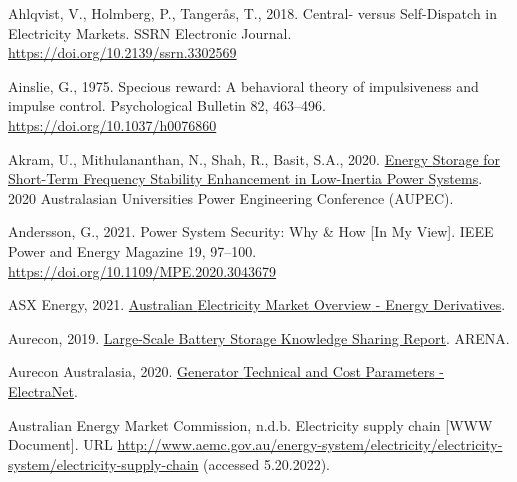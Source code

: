 \documentclass[12pt,a4paper,]{report}
\newlength{\cslhangindent}
\newenvironment{CSLReferences}[2] %
 {%
  \setlength{\parindent}{0pt}
  \ifodd #1 \everypar{\setlength{\hangindent}{\cslhangindent}}\ignorespaces\fi
  \ifnum #2 > 0
  \setlength{\parskip}{#2\baselineskip}
  \fi
 }%
 {}
\begin{document}
\begin{CSLReferences}{1}{0}
\leavevmode{}%
Ahlqvist, V., Holmberg, P., Tangerås, T., 2018. Central- versus
{Self-Dispatch} in {Electricity Markets}. SSRN Electronic Journal.
\url{https://doi.org/10.2139/ssrn.3302569}

\leavevmode{}%
Ainslie, G., 1975. Specious reward: {A} behavioral theory of
impulsiveness and impulse control. Psychological Bulletin 82, 463--496.
\url{https://doi.org/10.1037/h0076860}

\leavevmode{}%
Akram, U., Mithulananthan, N., Shah, R., Basit, S.A., 2020.
\href{https://www.semanticscholar.org/paper/Energy-Storage-for-Short-Term-Frequency-Stability-Akram-Mithulananthan/b74131f080c15125436fe65784135492fa318b02}{Energy
{Storage} for {Short-Term Frequency Stability Enhancement} in
{Low-Inertia Power Systems}}. 2020 Australasian Universities Power
Engineering Conference (AUPEC).

\leavevmode{}%
Andersson, G., 2021. Power {System Security}: {Why} \& {How} {[}{In My
View}{]}. IEEE Power and Energy Magazine 19, 97--100.
\url{https://doi.org/10.1109/MPE.2020.3043679}

\leavevmode{}%
ASX Energy, 2021.
\href{https://www.asxenergy.com.au/products/electricity_futures}{Australian
{Electricity Market Overview} - {Energy Derivatives}}.

\leavevmode{}%
Aurecon, 2019.
\href{https://arena.gov.au/knowledge-bank/large-scale-battery-storage-knowledge-sharing-report/}{Large-{Scale
Battery Storage Knowledge Sharing Report}}. ARENA.

\leavevmode{}%
Aurecon Australasia, 2020.
\href{https://www.electranet.com.au/wp-content/uploads/projects/2016/11/508986-REP-ElectraNet-Generator-Technical-And-Cost-Parameters-23July2020.pdf}{Generator
{Technical} and {Cost Parameters} - {ElectraNet}}.

\leavevmode{}%
Australian Energy Market Commission, n.d.b. Electricity supply chain
{[}WWW Document{]}. URL
\url{http://www.aemc.gov.au/energy-system/electricity/electricity-system/electricity-supply-chain}
(accessed 5.20.2022).


\end{CSLReferences}
\end{document}
